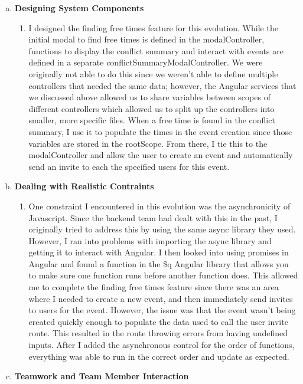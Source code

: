 \documentclass[11pt]{article}   %
\begin{document}
\begin{enumerate} [a)]
\begin{enumerate} [$\cdot$]
\end{enumerate}
\item {\bf Designing System Components}
\begin{enumerate} [$\cdot$]
\item I designed the finding free times feature for this evolution. While the initial modal to find free times is defined in the modalController, functions to display the conflict summary and interact with events are defined in a separate conflictSummaryModalController. We were originally not able to do this since we weren't able to define multiple controllers that needed the same data; however, the Angular services that we discussed above allowed us to share variables between scopes of different controllers which allowed us to split up the controllers into smaller, more specific files. When a free time is found in the conflict summary, I use it to populate the times in the event creation since those variables are stored in the rootScope. From there, I tie this to the modalController and allow the user to create an event and automatically send an invite to each the specified users for this event. 
\end{enumerate}
\item {\bf Dealing with Realistic Contraints}
\begin{enumerate} [$\cdot$]
\item One constraint I encountered in this evolution was the asynchronicity of Javascript. Since the backend team had dealt with this in the past, I originally tried to address this by using the same async library they used. However, I ran into problems with importing the async library and getting it to interact with Angular. I then looked into using promises in Angular and found a function in the \$q Angular library that allows you to make sure one function runs before another function does. This allowed me to complete the finding free times feature since there was an area where I needed to create a new event, and then immediately send invites to users for the event. However, the issue was that the event wasn't being created quickly enough to populate the data used to call the user invite route. This resulted in the route throwing errors from having undefined inputs. After I added the asynchronous control for the order of functions, everything was able to run in the correct order and update as expected.
\end{enumerate}
\item  {\bf Teamwork and Team Member Interaction}
\begin{enumerate} [$\cdot$]

\end{enumerate}
\end{enumerate}
\end{document}
